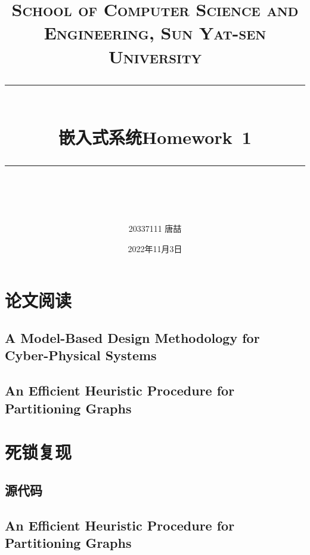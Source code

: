 \documentclass[a4paper, 12pt]{article}
\begin{document}
\title{	
    \normalfont \normalsize
    \textsc{School of Computer Science and Engineering, Sun Yat-sen University} \\ [25pt] %
    \rule{\textwidth}{0.5pt} \\[0.1cm] %
    \huge  嵌入式系统Homework\ 1\\ %
    \rule{\textwidth}{2pt} \\[0.1cm] %
    \author{20337111   唐喆}
    \date{\normalsize 2022年11月3日}
}


\maketitle
\thispagestyle{empty}
\tableofcontents
\newpage


\section{论文阅读}
\subsection{A Model-Based Design Methodology for Cyber-Physical Systems}
\subsection{An Efficient Heuristic Procedure for Partitioning 
Graphs}


\section{死锁复现}
\subsection{源代码}
\subsection{An Efficient Heuristic Procedure for Partitioning 
Graphs}
\end{document}
